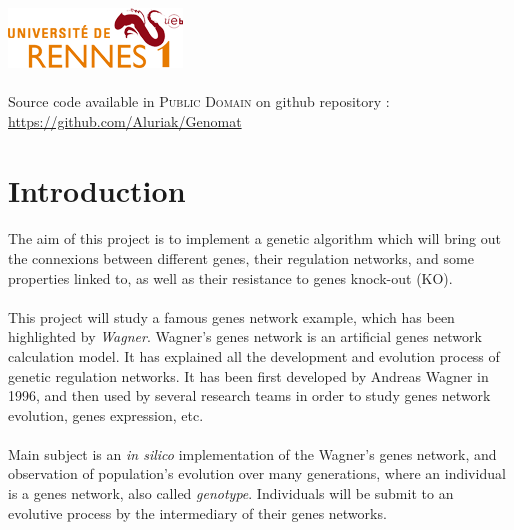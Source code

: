 \documentclass[]{report} %
\begin{document}
\begin{titlepage}
\includegraphics{rennes1_logo.png}\\[1cm] %


\paragraph*{}
Source code available in \textsc{Public Domain} on github repository :\\ \url{https://github.com/Aluriak/Genomat}

\end{titlepage}

\section*{Introduction}
	\paragraph*{}
	The aim of this project is to implement a genetic algorithm which will bring out the connexions between different genes, 
        their regulation networks, and some properties linked to, as well as their resistance to genes knock-out (KO).
	\paragraph*{}
        This project will study a famous genes network example, which has been highlighted by \textit{Wagner}. Wagner's genes network is an artificial genes network calculation model. 
        It has explained all the development and evolution process of genetic regulation networks. It has been first developed by Andreas Wagner in 1996, 
        and then used by several research teams in order to study genes network evolution, genes expression, etc.
	\paragraph*{}
        Main subject is an \textit{in silico} implementation of the Wagner's genes network, and observation of population's evolution over many generations, where an individual is a  genes network, also called \textit{genotype}. 
        Individuals will be submit to an evolutive process by the intermediary of their genes networks.
\end{document}
